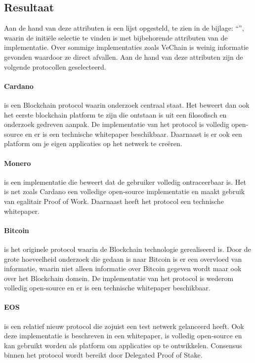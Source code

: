 \newpage
\subsection{Resultaat}

Aan de hand van deze attributen is een lijst opgesteld, te zien in de bijlage: ``'', waarin de initiële selectie te vinden is met bijbehorende attributen van de implementatie. Over sommige implementaties zoals VeChain is weinig informatie gevonden waardoor ze direct afvallen. Aan de hand van deze attributen zijn de volgende protocollen geselecteerd.

\paragraph{Cardano} is een Blockchain protocol waarin onderzoek centraal staat. Het beweert dan ook het eerste blockchain platform te zijn die ontstaan is uit een filosofisch en onderzoek gedreven aanpak. De implementatie van het protocol is volledig open-source en er is een technische whitepaper beschikbaar. Daarnaast is er ook een platform om je eigen applicaties op het netwerk te creëren.

\paragraph{Monero} is een implementatie die beweert dat de gebruiker volledig ontraceerbaar is. Het is net zoals Cardano een volledige open-source implementatie en maakt gebruik van egalitair Proof of Work. Daarnaast heeft het protocol een technische whitepaper. 

\paragraph{Bitcoin} is het originele protocol waarin de Blockchain technologie gerealiseerd is. Door de grote hoeveelheid onderzoek die gedaan is naar Bitcoin is er een overvloed van informatie, waarin niet alleen informatie over Bitcoin gegeven wordt maar ook over het Blockchain domein. De implementatie van het protocol is wederom volledig open-source en er is een technische whitepaper beschikbaar.

\paragraph{EOS} is een relatief nieuw protocol die zojuist een test netwerk gelanceerd heeft. Ook deze implementatie is beschreven in een whitepaper, is volledig open-source en kan gebruikt worden als platform om applicaties op te ontwikkelen. Consensus binnen het protocol wordt bereikt door Delegated Proof of Stake.

